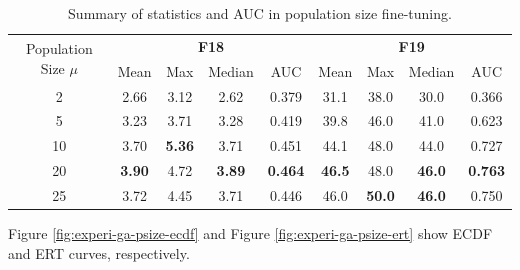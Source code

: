 \documentclass{article}
\begin{document}
\begin{table}[!ht]
    \centering
    \caption{Summary of statistics and AUC in population size fine-tuning.}
    \label{tab:experi-ga-psize}
    \begin{tabular}{ccccccccc}
        \toprule
        \multirow{2}[3]{*}{Population Size $\mu$} &
        \multicolumn{4}{c}{\textbf{F18}} &
        \multicolumn{4}{c}{\textbf{F19}}\\
        \cmidrule(lr){2-5}
        \cmidrule(lr){6-9}
        & Mean & Max & Median & AUC & Mean & Max & Median & AUC\\
        \midrule
        2   & 2.66 & 3.12 & 2.62 & 0.379 & 31.1 & 38.0 & 30.0 & 0.366\\
        5   & 3.23 & 3.71 & 3.28 & 0.419 & 39.8 & 46.0 & 41.0 & 0.623\\
        10  & 3.70 & \textbf{5.36} & 3.71 & 0.451 & 44.1 & 48.0 & 44.0 & 0.727\\
        20  & \textbf{3.90} & 4.72 & \textbf{3.89} & \textbf{0.464} & \textbf{46.5} & 48.0 & \textbf{46.0} & \textbf{0.763}\\
        25  & 3.72 & 4.45 & 3.71 & 0.446 & 46.0 & \textbf{50.0} & \textbf{46.0} & 0.750\\
        \bottomrule
    \end{tabular}
\end{table}

Figure \ref{fig:experi-ga-psize-ecdf} and Figure \ref{fig:experi-ga-psize-ert} show ECDF and ERT curves, respectively.
\end{document}
